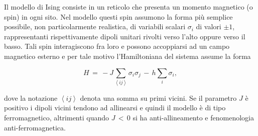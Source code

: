 Il modello di Ising consiste in un reticolo che presenta un momento magnetico (o spin) in ogni sito. Nel 
modello questi spin assumono la forma più semplice possibile, non particolarmente realistica, di variabili 
scalari $\sigma_i$ di valori $\pm 1$, rappresentanti rispettivamente dipoli unitari rivolti verso l'alto oppure 
verso il basso. Tali spin interagiscono fra loro e possono accoppiarsi ad un campo magnetico esterno e 
per tale motivo l'Hamiltoniana del sistema assume la forma 

\begin{equation}
    H\,=\,-J\sum_{\left<ij\right>} \sigma_i \sigma_j\,-\,h\sum_{i} \sigma_i,
    \label{eq: ising_ham}
\end{equation}

dove la notazione $\left<ij\right>$ denota una somma su primi vicini. Se il parametro $J$ è positivo i dipoli vicini 
tendono ad allinearsi e quindi il modello è di tipo ferromagnetico, altrimenti quando $J\,<\,0$ si ha anti-allineamento 
e fenomenologia anti-ferromagnetica.